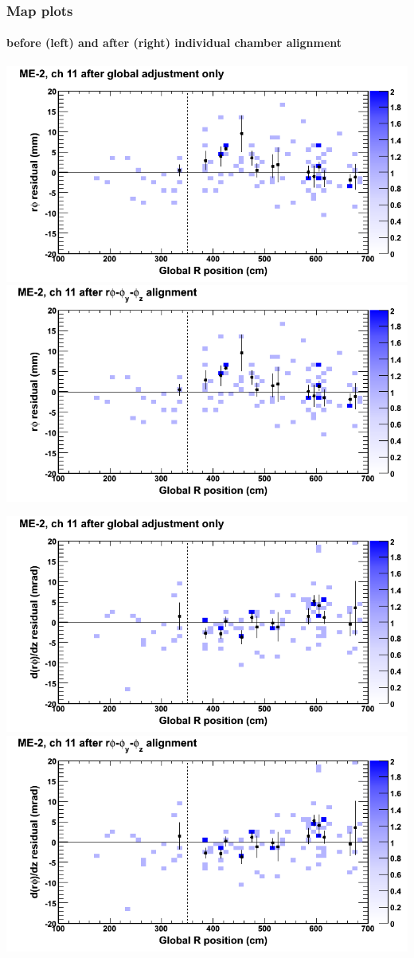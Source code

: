 \documentclass[compress]{beamer}
\begin{document}
\begin{frame}
\frametitle{Map plots}
\framesubtitle{before (left) and after (right) individual chamber alignment}
\includegraphics[width=0.5\linewidth]{ringmapplots_3dof/before_CSCvsr_mem2ch11_x.png} \includegraphics[width=0.5\linewidth]{ringmapplots_3dof/after_CSCvsr_mem2ch11_x.png}

\includegraphics[width=0.5\linewidth]{ringmapplots_3dof/before_CSCvsr_mem2ch11_dxdz.png} \includegraphics[width=0.5\linewidth]{ringmapplots_3dof/after_CSCvsr_mem2ch11_dxdz.png}
\end{frame}
\end{document}
